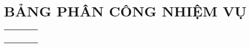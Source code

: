 
\chapter*{BẢNG PHÂN CÔNG NHIỆM VỤ}

\begin{table}[h!]
    \centering
    \begin{tabularx}{\textwidth}{|C{2.6cm}|L{3.2cm}|Y|C{2.0cm}|C{2.0cm}|}
        \hline
           &  &  &       &    \\ \hline
         &      &     &  & \rule{0pt}{0.8cm} \\ \hline
         &      &     &  & \rule{0pt}{0.8cm} \\ \hline
         &      &     &  & \rule{0pt}{0.8cm} \\ \hline
         &      &     &  & \rule{0pt}{0.8cm} \\ \hline
         &      &     &  & \rule{0pt}{0.8cm} \\ \hline
    \end{tabularx}
\end{table}
